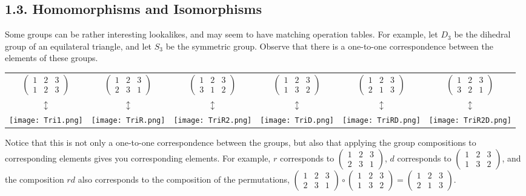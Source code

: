 \documentclass[leqno]{book}
\begin{document}
\subsection*{1.3. Homomorphisms and Isomorphisms}
Some groups can be rather interesting lookalikes, and may seem to have matching operation tables.  For example, let $D_3$ be the dihedral group of an equilateral triangle, and let $S_3$ be the symmetric group.  Observe that there is a one-to-one correspondence between the elements of these groups.
\begin{center}
\begin{tabular}{cccccc}
$\begin{pmatrix}1&2&3\\1&2&3\end{pmatrix}$ &
$\begin{pmatrix}1&2&3\\2&3&1\end{pmatrix}$ &
$\begin{pmatrix}1&2&3\\3&1&2\end{pmatrix}$ &
$\begin{pmatrix}1&2&3\\1&3&2\end{pmatrix}$ &
$\begin{pmatrix}1&2&3\\2&1&3\end{pmatrix}$ &
$\begin{pmatrix}1&2&3\\3&2&1\end{pmatrix}$ \\
$\updownarrow$ & $\updownarrow$ & $\updownarrow$ & $\updownarrow$ & $\updownarrow$ & $\updownarrow$ \\
\texttt{[image: Tri1.png]} &
\texttt{[image: TriR.png]} &
\texttt{[image: TriR2.png]} &
\texttt{[image: TriD.png]} &
\texttt{[image: TriRD.png]} &
\texttt{[image: TriR2D.png]}
\end{tabular}
\end{center}
Notice that this is not only a one-to-one correspondence between the groups, but also that applying the group compositions to corresponding elements gives you corresponding elements.  For example, $r$ corresponds to $\begin{pmatrix}1&2&3\\2&3&1\end{pmatrix}$, $d$ corresponds to $\begin{pmatrix}1&2&3\\1&3&2\end{pmatrix}$, and the composition $rd$ also corresponds to the composition of the permutations, $\begin{pmatrix}1&2&3\\2&3&1\end{pmatrix}\circ\begin{pmatrix}1&2&3\\1&3&2\end{pmatrix}=\begin{pmatrix}1&2&3\\2&1&3\end{pmatrix}$.
\end{document}
